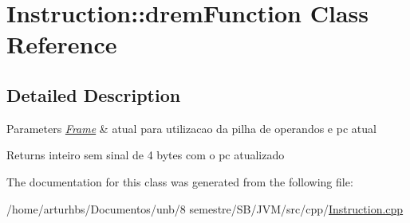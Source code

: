 \hypertarget{classInstruction_1_1dremFunction}{}\section{Instruction\+:\+:drem\+Function Class Reference}
\label{classInstruction_1_1dremFunction}


\subsection{Detailed Description}

\begin{DoxyParams}{Parameters}
{\em \hyperlink{classFrame}{Frame}} & atual para utilizacao da pilha de operandos e pc atual \\
\hline
\end{DoxyParams}
\begin{DoxyReturn}{Returns}
inteiro sem sinal de 4 bytes com o pc atualizado 
\end{DoxyReturn}


The documentation for this class was generated from the following file\+:\begin{DoxyCompactItemize}
\item 
/home/arturhbs/\+Documentos/unb/8 semestre/\+S\+B/\+J\+V\+M/src/cpp/\hyperlink{Instruction_8cpp}{Instruction.\+cpp}\end{DoxyCompactItemize}
